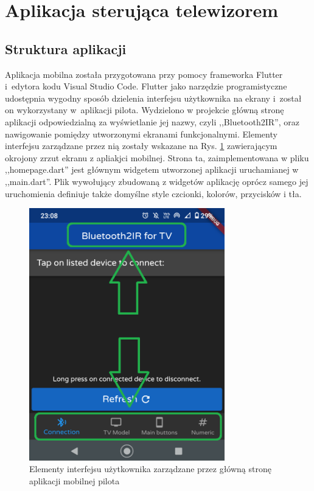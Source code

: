 \documentclass[12pt,twoside]{article}
\begin{document}
\clearpage

\section{Aplikacja sterująca telewizorem}
\subsection{Struktura aplikacji}
Aplikacja mobilna została przygotowana przy pomocy frameworka Flutter i~edytora kodu Visual Studio Code. Flutter jako narzędzie programistyczne udostępnia wygodny sposób dzielenia interfejsu użytkownika na ekrany i~został on wykorzystany w~aplikacji pilota. Wydzielono w projekcie główną stronę aplikacji odpowiedzialną za wyświetlanie jej nazwy, czyli ,,Bluetooth2IR'', oraz nawigowanie pomiędzy utworzonymi ekranami funkcjonalnymi. Elementy interfejsu zarządzane przez nią zostały wskazane na Rys. \ref*{Fig:mainPageElements} zawierającym okrojony zrzut ekranu z apliakjci mobilnej. Strona ta, zaimplementowana w pliku ,,homepage.dart'' jest głównym widgetem utworzonej aplikacji uruchamianej w ,,main.dart''. Plik wywołujący zbudowaną z widgetów aplikację oprócz samego jej uruchomienia definiuje także domyślne style czcionki, kolorów, przycisków i tła.
\begin{figure}[ht]
   \centering
   \includegraphics[width=8.5cm]{images/mainPageElements.png}
   \caption{Elementy interfejsu użytkownika zarządzane przez główną stronę aplikacji mobilnej pilota}
   \label{Fig:mainPageElements}
\end{figure}
\end{document}
